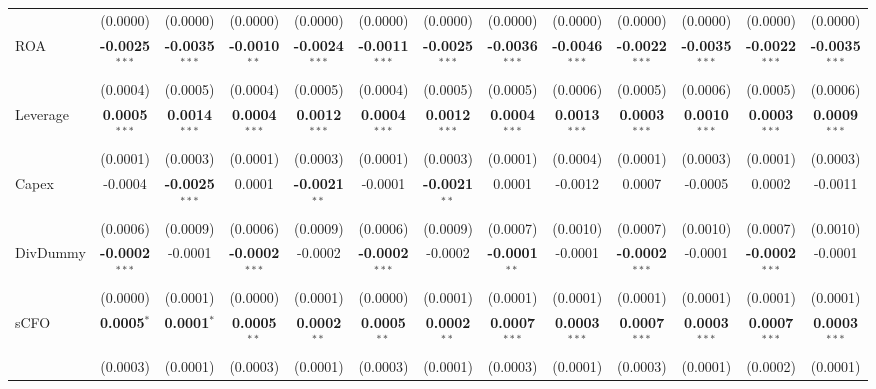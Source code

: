 \documentclass[11pt,a4paper]{article}
\begin{document}
\begin{table}[htbp]
\begin{tabular}{lcccccccccccc}
 & (0.0000) & (0.0000) & (0.0000) & (0.0000) & (0.0000) & (0.0000) & (0.0000) & (0.0000) & (0.0000) & (0.0000) & (0.0000) & (0.0000) \\
ROA & \textbf{-0.0025}$^{***}$ & \textbf{-0.0035}$^{***}$ & \textbf{-0.0010}$^{**}$ & \textbf{-0.0024}$^{***}$ & \textbf{-0.0011}$^{***}$ & \textbf{-0.0025}$^{***}$ & \textbf{-0.0036}$^{***}$ & \textbf{-0.0046}$^{***}$ & \textbf{-0.0022}$^{***}$ & \textbf{-0.0035}$^{***}$ & \textbf{-0.0022}$^{***}$ & \textbf{-0.0035}$^{***}$ \\
 & (0.0004) & (0.0005) & (0.0004) & (0.0005) & (0.0004) & (0.0005) & (0.0005) & (0.0006) & (0.0005) & (0.0006) & (0.0005) & (0.0006) \\
Leverage & \textbf{0.0005}$^{***}$ & \textbf{0.0014}$^{***}$ & \textbf{0.0004}$^{***}$ & \textbf{0.0012}$^{***}$ & \textbf{0.0004}$^{***}$ & \textbf{0.0012}$^{***}$ & \textbf{0.0004}$^{***}$ & \textbf{0.0013}$^{***}$ & \textbf{0.0003}$^{***}$ & \textbf{0.0010}$^{***}$ & \textbf{0.0003}$^{***}$ & \textbf{0.0009}$^{***}$ \\
 & (0.0001) & (0.0003) & (0.0001) & (0.0003) & (0.0001) & (0.0003) & (0.0001) & (0.0004) & (0.0001) & (0.0003) & (0.0001) & (0.0003) \\
Capex & -0.0004 & \textbf{-0.0025}$^{***}$ & 0.0001 & \textbf{-0.0021}$^{**}$ & -0.0001 & \textbf{-0.0021}$^{**}$ & 0.0001 & -0.0012 & 0.0007 & -0.0005 & 0.0002 & -0.0011 \\
 & (0.0006) & (0.0009) & (0.0006) & (0.0009) & (0.0006) & (0.0009) & (0.0007) & (0.0010) & (0.0007) & (0.0010) & (0.0007) & (0.0010) \\
DivDummy & \textbf{-0.0002}$^{***}$ & -0.0001 & \textbf{-0.0002}$^{***}$ & -0.0002 & \textbf{-0.0002}$^{***}$ & -0.0002 & \textbf{-0.0001}$^{**}$ & -0.0001 & \textbf{-0.0002}$^{***}$ & -0.0001 & \textbf{-0.0002}$^{***}$ & -0.0001 \\
 & (0.0000) & (0.0001) & (0.0000) & (0.0001) & (0.0000) & (0.0001) & (0.0001) & (0.0001) & (0.0001) & (0.0001) & (0.0001) & (0.0001) \\
sCFO & \textbf{0.0005}$^{*}$ & \textbf{0.0001}$^{*}$ & \textbf{0.0005}$^{**}$ & \textbf{0.0002}$^{**}$ & \textbf{0.0005}$^{**}$ & \textbf{0.0002}$^{**}$ & \textbf{0.0007}$^{***}$ & \textbf{0.0003}$^{***}$ & \textbf{0.0007}$^{***}$ & \textbf{0.0003}$^{***}$ & \textbf{0.0007}$^{***}$ & \textbf{0.0003}$^{***}$ \\
 & (0.0003) & (0.0001) & (0.0003) & (0.0001) & (0.0003) & (0.0001) & (0.0003) & (0.0001) & (0.0003) & (0.0001) & (0.0002) & (0.0001) \\

\end{tabular}
\end{table}
\end{document}
